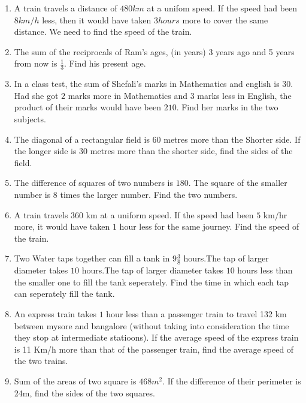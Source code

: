 \begin{enumerate}[label=\thesubsection.\arabic*,ref=\thesubsection.\theenumi,resume*]
\item A train travels a distance of $480km$ at a unifom speed. If the speed had been $8km/h$ less, then it would have taken $3 hours$ more to cover the same distance. We need to find the speed of the train.
\item The sum of the reciprocals of Ram's ages, (in years) 3 years ago and 5 years from now is $\frac{1}{3}$. Find his present age.
\item In a class test, the sum of Shefali's  marks in Mathematics and english is $30$. Had she got $2$ marks more in Mathematics and $3$ marks less in English, the product of their marks would have been $210$. Find her marks in the two subjects. 
\item The diagonal of a rectangular field is $60$ metres more than the Shorter side. If the longer side is $30$ metres more than the shorter side, find the sides of the field.
\item The difference of squares of two numbers is $180$. The square of the smaller number is $8$ times the larger number. Find the two numbers.
\item A train travels $360$ km at a uniform speed. If the speed had been $5$ km/hr more, it would have taken $1$ hour less for the same journey. Find the speed of the train.
\item Two Water taps together can fill a tank in $9\frac{3}{8}$ hours.The tap of larger diameter takes $10$ hours.The tap of larger diameter takes $10$ hours less than the smaller one to fill the tank seperately. Find the time in which each tap can seperately fill the  tank.
\item An express train takes $1$ hour less than a passenger train to travel 132 km between mysore and bangalore (without taking into consideration the time they stop at intermediate statioons). If the average speed of the express train is 11 Km/h more than that of the passenger train, find the average speed of the two trains.
\item Sum of the areas of two square is $468m^2$. If the difference of their perimeter is 24m, find the sides of the two squares.  
\end{enumerate}

